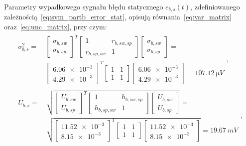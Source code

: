 Parametry wypadkowego sygnału błędu statycznego $e_{b,s}(t)$, zdefiniowanego zależnością~\eqref{eq:sym_partb_error_stat}, opisują równania~\eqref{eq:var_matrix} oraz~\eqref{eq:unc_matrix}, przy czym:
\begin{gather}
\begin{split}
\sigma_{b,s}^{2} = ~ &
\begin{bmatrix}
\sigma_{b,sw} \\ \sigma_{b,sp}
\end{bmatrix}^{T}
\begin{bmatrix}
1 & r_{b,sw,sp} \\
r_{b,sp,sw} & 1
\end{bmatrix}
\begin{bmatrix}
\sigma_{b,sw} \\ \sigma_{b,sp}
\end{bmatrix} = \\ &
\begin{bmatrix}
\num{6.06e-3} \\ \num{4.29e-3}
\end{bmatrix}^{T}
\begin{bmatrix}
1 & 1 \\
1 & 1
\end{bmatrix}
\begin{bmatrix}
\num{6.06e-3} \\ \num{4.29e-3}
\end{bmatrix} = \qty{107.12}{\micro V}
\end{split}
\label{eq:sym_partb_stat_var}, \\
\begin{split}
U_{b,s} = ~ & \sqrt{
\begin{bmatrix}
U_{b,sw} \\ U_{b,sp}
\end{bmatrix}^{T}
\begin{bmatrix}
1 & h_{b,sw,sp} \\
h_{b,sp,sw} & 1
\end{bmatrix}
\begin{bmatrix}
U_{b,sw} \\ U_{b,sp}
\end{bmatrix}} = \\ & \sqrt{
\begin{bmatrix}
\num{11.52e-3} \\ \num{8.15e-3}
\end{bmatrix}^{T}
\begin{bmatrix}
1 & 1 \\
1 & 1
\end{bmatrix}
\begin{bmatrix}
\num{11.52e-3} \\ \num{8.15e-3}
\end{bmatrix}} = \qty{19.67}{mV}
\end{split}
\label{eq:sym_partb_stat_uncert},
\end{gather}
